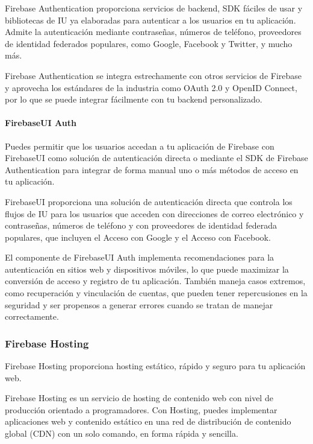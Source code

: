 Firebase Authentication proporciona servicios de backend, SDK fáciles de usar y
bibliotecas de IU ya elaboradas para autenticar a los usuarios en tu aplicación.
Admite la autenticación mediante contraseñas, números de teléfono, proveedores
de identidad federados populares, como Google, Facebook y Twitter, y mucho más.

Firebase Authentication se integra estrechamente con otros servicios de Firebase
y aprovecha los estándares de la industria como OAuth 2.0 y OpenID Connect, por
lo que se puede integrar fácilmente con tu backend personalizado.


\paragraph{FirebaseUI Auth}
\label{\detokenize{chapter_one/firebase:firebaseui-auth}}
Puedes permitir que los usuarios accedan a tu aplicación de Firebase con FirebaseUI
como solución de autenticación directa o mediante el SDK de Firebase
Authentication para integrar de forma manual uno o más métodos de acceso en tu
aplicación.

FirebaseUI proporciona una solución de autenticación directa que controla los
flujos de IU para los usuarios que acceden con direcciones de correo electrónico
y contraseñas, números de teléfono y con proveedores de identidad federada
populares, que incluyen el Acceso con Google y el Acceso con Facebook.

El componente de FirebaseUI Auth implementa recomendaciones para la autenticación
en sitios web y dispositivos móviles, lo que puede maximizar la conversión de
acceso y registro de tu aplicación. También maneja casos extremos, como recuperación
y vinculación de cuentas, que pueden tener repercusiones en la seguridad y ser
propensos a generar errores cuando se tratan de manejar correctamente.



\subsubsection{Firebase Hosting}
\label{\detokenize{chapter_one/firebase:firebase-hosting}}
Firebase Hosting proporciona hosting estático, rápido y seguro para tu aplicación web.

Firebase Hosting es un servicio de hosting de contenido web con nivel de
producción orientado a programadores. Con Hosting, puedes implementar aplicaciones web
y contenido estático en una red de distribución de contenido global (CDN) con
un solo comando, en forma rápida y sencilla.


